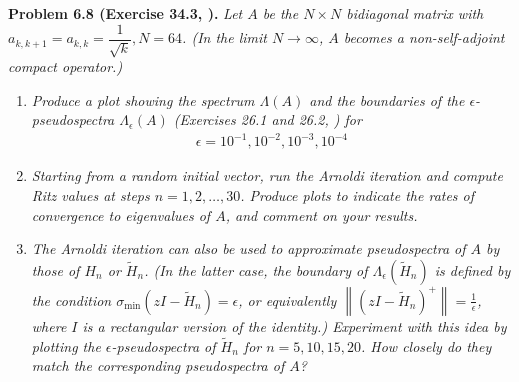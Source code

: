 \documentclass[a4paper,oneside]{book}
\numberwithin{equation}{chapter}
\begin{document}
\textbf{Problem 6.8 (Exercise 34.3, \cite{1}).} \textit{Let $A$ be the $N\times N$ bidiagonal matrix with $a_{k,k+1}=a_{k,k}=\dfrac{1}{\sqrt k},N=64$. (In the limit $N\to \infty$, $A$ becomes a non-self-adjoint compact operator.)}
\begin{enumerate}
\item \textit{Produce a plot showing the spectrum $\Lambda \left( A \right)$ and the boundaries of the $\epsilon$-pseudospectra $\Lambda _\epsilon \left( A \right)$ (Exercises 26.1 and 26.2, \cite{1}) for}
\begin{align}
\epsilon = 10^{-1},10^{-2},10^{-3},10^{-4}
\end{align}
\item \textit{Starting from a random initial vector, run the Arnoldi iteration and compute Ritz values at steps $n=1,2,\ldots,30$. Produce plots to indicate the rates of convergence to eigenvalues of $A$, and comment on your results.}
\item \textit{The Arnoldi iteration can also be used to approximate pseudospectra of $A$ by those of $H_n$ or $\tilde H_n$. (In the latter case, the boundary of $\Lambda _\epsilon \left(\tilde H _n\right)$ is defined by the condition ${\sigma _{\min }}\left( {zI - {{\tilde H}_n}} \right) = \epsilon $, or equivalently $\left\| {{{\left( {zI - {{\tilde H}_n}} \right)}^ + }} \right\| = \frac{1}{\epsilon }$, where $I$ is a rectangular version of the identity.) Experiment with this idea by plotting the $\epsilon$-pseudospectra of $\tilde H_n$ for $n=5,10,15,20$. How closely do they match the corresponding pseudospectra of $A$?}
\end{enumerate}
\end{document}

